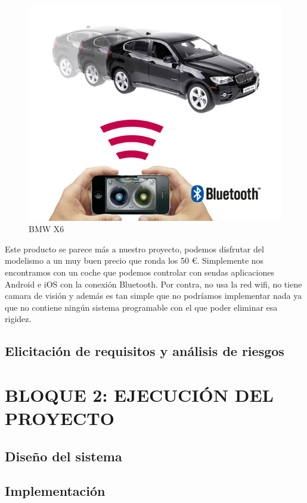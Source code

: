 \documentclass{pclass}
\begin{document}
\begin{figure}[H]
  \centering
    \includegraphics[width=1.1\textwidth]{img/producto2}
  \caption{BMW X6}
  \label{fig:BMWX6}
\end{figure}


Este producto se parece más a nuestro proyecto, podemos disfrutar del modelismo a un muy buen precio que ronda los 50 \euro. Simplemente nos encontramos con un coche que podemos controlar con sendas aplicaciones Android e iOS con la conexión Bluetooth. Por contra, no usa la red wifi, no tiene camara de visión y además es tan simple que no podríamos implementar nada ya que no contiene ningún sistema programable con el que poder eliminar esa rigidez.



\section{Elicitaci\'on de requisitos y an\'alisis de riesgos}
\chapter{BLOQUE 2: EJECUCI\'ON DEL PROYECTO}
\section{Diseño del sistema} 
\section{Implementación} 
\end{document}
